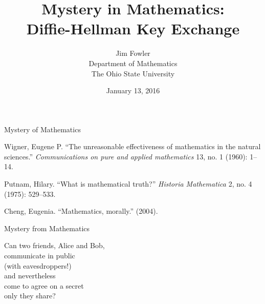 \documentclass[14pt,aspectratio=169]{beamer}
\author{Jim Fowler \\ Department of Mathematics \\ The Ohio State University}
\date{January 13, 2016}
\title{Mystery in Mathematics: \\ Diffie-Hellman Key Exchange}
\begin{document}
\begin{frame}
\maketitle
\end{frame}

\begin{frame}
  \Huge

  \begin{center}
    Mystery of Mathematics
  \end{center}
\end{frame}

\begin{frame}
\hangindent=0.7cm Wigner, Eugene P. ``The unreasonable effectiveness of mathematics in the natural sciences.'' \textit{Communications on pure and applied mathematics} 13, no. 1 (1960): 1--14.

\vfill

\hangindent=0.7cm Putnam, Hilary. ``What is mathematical truth?'' \textit{Historia Mathematica} 2, no. 4 (1975): 529--533.

\vfill

\hangindent=0.7cm Cheng, Eugenia. ``Mathematics, morally.'' (2004).
\end{frame}

\begin{frame}
  \Huge

  \begin{center}
    Mystery from Mathematics
  \end{center}
\end{frame}


\begin{frame}
  \huge

  Can two friends, Alice and Bob, \\
  \quad communicate in public \\
  \quad \quad (with eavesdroppers!) \\
  and nevertheless \\
  \quad come to agree on a secret \\
  \quad only they share?
\end{frame}

\newcommand{\swatch}[1]{\textcolor{#1}{\rule{12pt}{12pt}}}

\newcommand{\aliceroombob}[3]{%
  \begin{tabular}{@{}p{0.33\textwidth}@{}p{0.33\textwidth}@{}p{0.33\textwidth}@{}}
    \begin{center}#1\end{center} & \begin{center}#2\end{center} & \begin{center}#3\end{center} 
  \end{tabular}\\[-6ex]}
\end{document}
